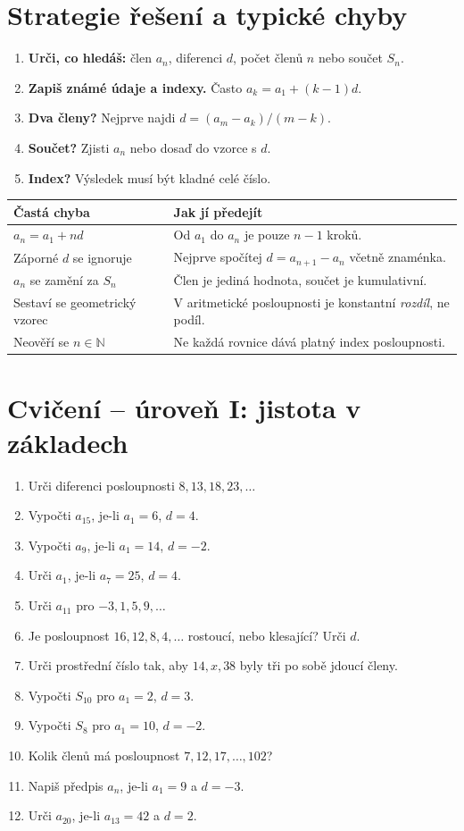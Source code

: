 \documentclass[11pt,a4paper]{article}
\begin{document}
\section{Strategie řešení a typické chyby}
\begin{enumerate}
\item \textbf{Urči, co hledáš:} člen $a_n$, diferenci $d$, počet členů $n$ nebo součet $S_n$.
\item \textbf{Zapiš známé údaje a indexy.} Často $a_k=a_1+(k-1)d$.
\item \textbf{Dva členy?} Nejprve najdi $d=(a_m-a_k)/(m-k)$.
\item \textbf{Součet?} Zjisti $a_n$ nebo dosaď do vzorce s $d$.
\item \textbf{Index?} Výsledek musí být kladné celé číslo.
\end{enumerate}
\begin{tabular}{@{}p{}p{}@{}}
\toprule
\textbf{Častá chyba}&\textbf{Jak jí předejít}\\\midrule
$a_n=a_1+nd$&Od $a_1$ do $a_n$ je pouze $n-1$ kroků.\\
Záporné $d$ se ignoruje&Nejprve spočítej $d=a_{n+1}-a_n$ včetně znaménka.\\
$a_n$ se zamění za $S_n$&Člen je jediná hodnota, součet je kumulativní.\\
Sestaví se geometrický vzorec&V aritmetické posloupnosti je konstantní \emph{rozdíl}, ne podíl.\\
Neověří se $n\in\mathbb N$&Ne každá rovnice dává platný index posloupnosti.\\\bottomrule
\end{tabular}

\section{Cvičení -- úroveň I: jistota v základech}
\begin{enumerate}[label=\textbf{I.\arabic*}]
\item Urči diferenci posloupnosti $8,13,18,23,\ldots$
\item Vypočti $a_{15}$, je-li $a_1=6$, $d=4$.
\item Vypočti $a_9$, je-li $a_1=14$, $d=-2$.
\item Urči $a_1$, je-li $a_7=25$, $d=4$.
\item Urči $a_{11}$ pro $-3,1,5,9,\ldots$
\item Je posloupnost $16,12,8,4,\ldots$ rostoucí, nebo klesající? Urči $d$.
\item Urči prostřední číslo tak, aby $14,x,38$ byly tři po sobě jdoucí členy.
\item Vypočti $S_{10}$ pro $a_1=2$, $d=3$.
\item Vypočti $S_8$ pro $a_1=10$, $d=-2$.
\item Kolik členů má posloupnost $7,12,17,\ldots,102$?
\item Napiš předpis $a_n$, je-li $a_1=9$ a $d=-3$.
\item Urči $a_{20}$, je-li $a_{13}=42$ a $d=2$.
\end{enumerate}
\end{document}
